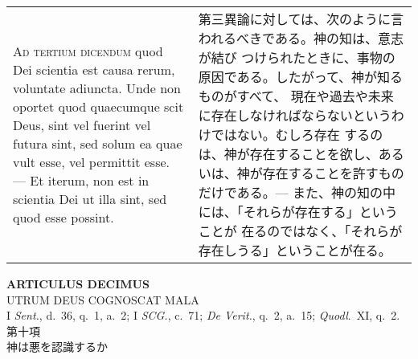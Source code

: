 \documentclass[10pt]{jsarticle} %
\begin{document}
\begin{longtable}{p{21em}p{21em}}
\\



{\scshape Ad tertium dicendum} quod Dei scientia est causa rerum,
voluntate adiuncta. Unde non oportet quod quaecumque scit Deus, sint
vel fuerint vel futura sint, sed solum ea quae vult esse, vel
permittit esse. --- Et iterum, non est in scientia Dei ut illa sint,
sed quod esse possint.


&


第三異論に対しては、次のように言われるべきである。神の知は、意志が結び
つけられたときに、事物の原因である。したがって、神が知るものがすべて、
現在や過去や未来に存在しなければならないというわけではない。むしろ存在
するのは、神が存在することを欲し、あるいは、神が存在することを許すもの
だけである。--- また、神の知の中には、「それらが存在する」ということが
在るのではなく、「それらが存在しうる」ということが在る。

\end{longtable}
\newpage



\begin{center}
 {\Large {\bf ARTICULUS DECIMUS}}\\
 {\large UTRUM DEUS COGNOSCAT MALA}\\
 {\footnotesize I {\itshape Sent.}, d.~36, q.~1, a.~2; I {\itshape
 SCG.}, c.~71; {\itshape De Verit.}, q.~2, a.~15; {\itshape Quodl}.~XI, q.~2.}\\
 {\Large 第十項\\神は悪を認識するか}
\end{center}
\end{document}
